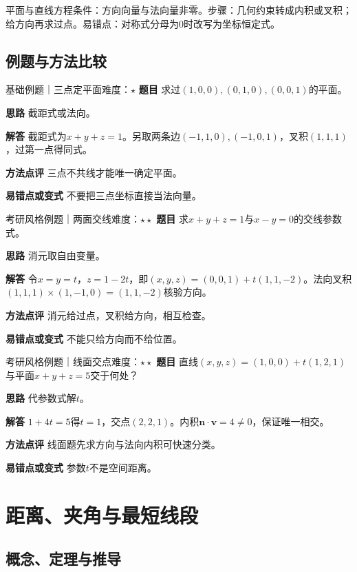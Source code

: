 \begin{method}{平面与直线方程}条件：方向向量与法向量非零。步骤：几何约束转成内积或叉积；给方向再求过点。易错点：对称式分母为0时改写为坐标恒定式。\end{method}
\subsection{例题与方法比较}
\begin{example}{基础例题｜三点定平面}{难度：$\star$}
\label{ex:5:7}\textbf{题目} 求过$(1,0,0),(0,1,0),(0,0,1)$的平面。\par
\textbf{思路} 截距式或法向。\par
\textbf{解答} 截距式为$x+y+z=1$。另取两条边$(-1,1,0),(-1,0,1)$，叉积$(1,1,1)$，过第一点得同式。\par
\textbf{方法点评} 三点不共线才能唯一确定平面。\par
\textbf{易错点或变式} 不要把三点坐标直接当法向量。
\end{example}
\begin{example}{考研风格例题｜两面交线}{难度：$\star\star$}
\label{ex:5:8}\textbf{题目} 求$x+y+z=1$与$x-y=0$的交线参数式。\par
\textbf{思路} 消元取自由变量。\par
\textbf{解答} 令$x=y=t$，$z=1-2t$，即$(x,y,z)=(0,0,1)+t(1,1,-2)$。法向叉积$(1,1,1)\times(1,-1,0)=(1,1,-2)$核验方向。\par
\textbf{方法点评} 消元给过点，叉积给方向，相互检查。\par
\textbf{易错点或变式} 不能只给方向而不给位置。
\end{example}
\begin{example}{考研风格例题｜线面交点}{难度：$\star\star$}
\label{ex:5:9}\textbf{题目} 直线$(x,y,z)=(1,0,0)+t(1,2,1)$与平面$x+y+z=5$交于何处？\par
\textbf{思路} 代参数式解$t$。\par
\textbf{解答} $1+4t=5$得$t=1$，交点$(2,2,1)$。内积$\bm n\cdot\bm v=4\ne0$，保证唯一相交。\par
\textbf{方法点评} 线面题先求方向与法向内积可快速分类。\par
\textbf{易错点或变式} 参数$t$不是空间距离。
\end{example}
\section{距离、夹角与最短线段}\label{sec:5:4}
\subsection{概念、定理与推导}

